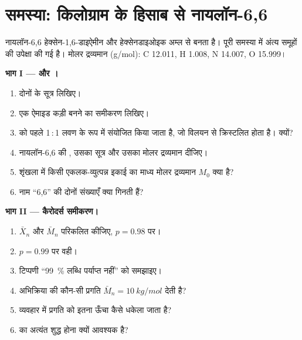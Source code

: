 \section{समस्या: किलोग्राम के हिसाब से नायलॉन-6,6}

\begin{problem}
\label{pb:b2:polymer-synthesis:1}
नायलॉन-6,6 हेक्सेन-1,6-डाइऐमीन और हेक्सेनडाइओइक अम्ल से बनता है। पूरी समस्या में अंत्य समूहों की उपेक्षा की गई है।
मोलर द्रव्यमान (\unit{g/mol}): C 12.011, H 1.008, N 14.007, O 15.999।

\medskip
\noindent\textbf{भाग I ---  और ।}
\begin{enumerate}
  \item दोनों  के सूत्र लिखिए।
  \item एक ऐमाइड कड़ी बनने का समीकरण लिखिए।
  \item {} को पहले 1\,:\,1 लवण के रूप में संयोजित किया जाता है, जो विलयन से क्रिस्टलित होता है। क्यों?
  \item नायलॉन-6,6 की , उसका सूत्र और उसका मोलर द्रव्यमान दीजिए।
  \item शृंखला में किसी एकलक-व्युत्पन्न इकाई का माध्य मोलर द्रव्यमान $M_0$ क्या है?
  \item नाम ``6,6'' की दोनों संख्याएँ क्या गिनती हैं?
\end{enumerate}

\medskip
\noindent\textbf{भाग II --- कैरोदर्स समीकरण।}
\begin{enumerate}[resume]
  \item $\bar X_n$ और $\bar M_n$ परिकलित कीजिए, $p = 0.98$ पर।
  \item $p = 0.99$ पर वही।
  \item टिप्पणी ``99~\% लब्धि पर्याप्त नहीं'' को समझाइए।
  \item अभिक्रिया की कौन-सी प्रगति $\bar M_n = \qty{10}{kg/mol}$ देती है?
  \item व्यवहार में प्रगति को इतना ऊँचा कैसे धकेला जाता है?
  \item {} का अत्यंत शुद्ध होना क्यों आवश्यक है?
\end{enumerate}


\end{problem}
